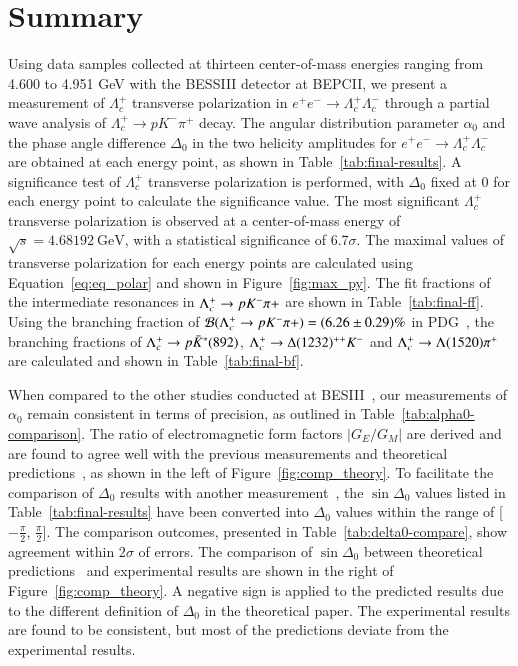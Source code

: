 \clearpage 
\section{Summary}
\label{sec:summary}
Using data samples collected at thirteen center-of-mass energies ranging from 4.600 to 4.951 GeV with the BESSIII detector at BEPCII, we present a measurement of $\Lambda_c^+$ transverse polarization in $e^+e^- \to \Lambda_c^+ \Lambda_c^-$ through a partial wave analysis of $\Lambda_c^+ \to p K^- \pi^+$ decay. The angular distribution parameter $\alpha_0$ and the phase angle difference $\Delta_0$ in the two helicity amplitudes for $e^+e^- \to \Lambda_c^+ \Lambda_c^-$ are obtained at each energy point, as shown in Table~\ref{tab:final-results}. A significance test of $\Lambda_c^+$ transverse polarization is performed, with $\Delta_0$ fixed at 0 for each energy point to calculate the significance value. The most significant $\Lambda_c^+$ transverse polarization is observed at a center-of-mass energy of $\sqrt{s} = 4.68192\ \text{GeV}$, with a statistical significance of 6.7$\sigma$. The maximal values of transverse polarization for each energy points are calculated using Equation~\ref{eq:eq_polar} and shown in Figure~\ref{fig:max_py}. The fit fractions of the intermediate resonances in $\Lambda_{c}^{+} \rightarrow p K^-\pi+$ are shown in Table~\ref{tab:final-ff}. Using the branching fraction of $\mathcal{B}(\Lambda_{c}^{+} \rightarrow p K^-\pi+) = (6.26\pm0.29)\%$ in PDG~\cite{Workman:2022ynf}, the branching fractions of $\Lambda_{c}^{+} \rightarrow p\bar{K}^*(892)$, $\Lambda_{c}^{+} \rightarrow \Delta(1232)^{++}K^-$ and $\Lambda_{c}^{+} \rightarrow \Lambda(1520)\pi^+$ are calculated and shown in Table~\ref{tab:final-bf}.

When compared to the other studies conducted at BESIII~\cite{BESIII:2017kqg,BESIII:2023rwv}, our measurements of $\alpha_0$ remain consistent in terms of precision, as outlined in Table~\ref{tab:alpha0-comparison}.
The ratio of electromagnetic form factors $|G_E/G_M|$ are derived and are found to agree well with the previous measurements and theoretical predictions~\cite{Chen:2023oqs}, as shown in the left of Figure~\ref{fig:comp_theory}.
To facilitate the comparison of $\Delta_0$ results with another measurement~\cite{ESIIImemo:LcDecayAsy}, the $\sin\Delta_0$ values listed in Table~\ref{tab:final-results} have been converted into $\Delta_0$ values within the range of [$-\frac{\pi}{2}$, $\frac{\pi}{2}$]. The comparison outcomes, presented in Table~\ref{tab:delta0-compare}, show agreement within 2$\sigma$ of errors. The comparison of $\sin\Delta_0$ between theoretical predictions~\cite{Chen:2023oqs} and experimental results are shown in the right of Figure~\ref{fig:comp_theory}. A negative sign is applied to the predicted results due to the different definition of $\Delta_0$ in the theoretical paper. The experimental results are found to be consistent, but most of the predictions deviate from the experimental results.

